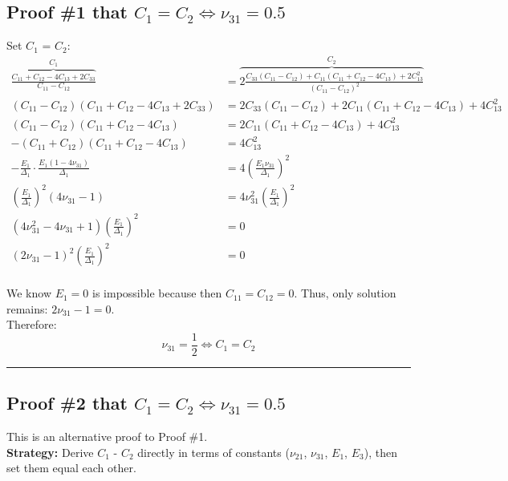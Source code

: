 \documentclass{article}
\begin{document}
\subsection{Proof \#1 that $C_1\!=\!C_2 \iff \nu_{31}\!=\!0.5$}

Set $C_1$ = $C_2$:
\begin{align}
\overbrace{\frac{C_{11} +C_{12} -4C_{13} +2C_{33}}{C_{11}-C_{12}}}^{C_1}
 &= \overbrace{ 2 \frac{C_{33} \left( C_{11} - C_{12} \right) + C_{11} \left( C_{11}+C_{12}-4C_{13} \right) + 2C_{13}^2 }{\left( C_{11}-C_{12} \right)^2} }^{C_2}  \\
\left( C_{11}-C_{12} \right) \left( C_{11} +C_{12} -4C_{13} +2C_{33} \right) &= 2 C_{33} \left( C_{11} - C_{12} \right) + 2 C_{11} \left( C_{11}+C_{12}-4C_{13} \right) + 4 C_{13}^2   \\
\left( C_{11}-C_{12} \right) \left( C_{11} +C_{12} -4C_{13} \right) &=  2 C_{11} \left( C_{11}+C_{12}-4C_{13} \right) + 4 C_{13}^2  \\
-\left( C_{11}+C_{12} \right) \left( C_{11} +C_{12} -4C_{13} \right) &=  4 C_{13}^2  \\
- \frac{E_1}{\Delta_1} \cdot \frac{E_1 \left(1-4\nu_{31} \right)}{\Delta_1} &= 4 \left( \frac{E_1 \nu_{31}}{\Delta_1} \right)^2 \\
\left( \frac{E_1}{\Delta_1} \right)^2 \left(4\nu_{31}-1 \right) &= 4 \nu_{31}^2 \left( \frac{E_1}{\Delta_1} \right)^2 \\
\left( 4 \nu_{31}^2 -4 \nu_{31} +1 \right) \left( \frac{E_1}{\Delta_1} \right)^2 &= 0 \\
\left( 2 \nu_{31} -1 \right)^2 \left( \frac{E_1}{\Delta_1} \right)^2 &= 0 \\
\end{align}

We know $E_1=0$ is impossible because then $C_{11}=C_{12}=0$. Thus, only solution remains: $2 \nu_{31} -1 = 0$.  \\
Therefore: 
$$\boxed{\nu_{31} = \frac{1}{2} \iff C_1=C_2}$$

\noindent\rule{20cm}{0.8pt}

\newpage 
\subsection{Proof \#2 that $C_1\!=\!C_2 \iff \nu_{31}\!=\!0.5$}
This is an alternative proof to Proof \#1.  \\
\textbf{Strategy:} Derive $C_1$ - $C_2$ directly in terms of constants ($\nu_{21}$, $\nu_{31}$, $E_1$, $E_3$), then set them equal each other.
\end{document}
